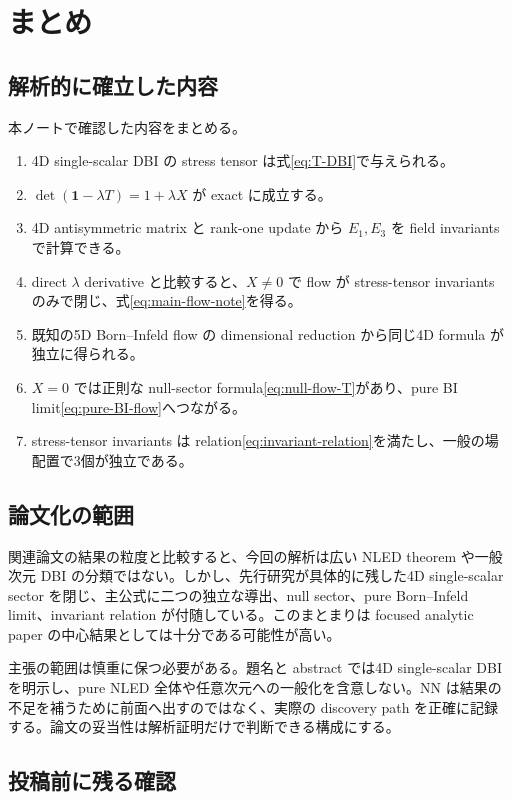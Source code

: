 \documentclass[a4paper,11pt]{ltjsreport}
\newcommand{\Id}{\mathbf 1}
\begin{document}
\chapter{まとめ}

\section{解析的に確立した内容}

本ノートで確認した内容をまとめる。
\begin{enumerate}[label=\arabic*.]
 \item 4D single-scalar DBI の stress tensor は式\eqref{eq:T-DBI}で与えられる。
 \item $\det(\Id-\lambda T)=1+\lambda X$ が exact に成立する。
 \item 4D antisymmetric matrix と rank-one update から $E_1,E_3$ を field invariants で計算できる。
 \item direct $\lambda$ derivative と比較すると、$X\neq0$ で flow が stress-tensor invariants のみで閉じ、式\eqref{eq:main-flow-note}を得る。
 \item 既知の5D Born--Infeld flow の dimensional reduction から同じ4D formula が独立に得られる。
 \item $X=0$ では正則な null-sector formula\eqref{eq:null-flow-T}があり、pure BI limit\eqref{eq:pure-BI-flow}へつながる。
 \item stress-tensor invariants は relation\eqref{eq:invariant-relation}を満たし、一般の場配置で3個が独立である。
\end{enumerate}

\section{論文化の範囲}

関連論文の結果の粒度と比較すると、今回の解析は広い NLED theorem や一般次元 DBI の分類ではない。しかし、先行研究が具体的に残した4D single-scalar sector を閉じ、主公式に二つの独立な導出、null sector、pure Born--Infeld limit、invariant relation が付随している。このまとまりは focused analytic paper の中心結果としては十分である可能性が高い。

主張の範囲は慎重に保つ必要がある。題名と abstract では4D single-scalar DBI を明示し、pure NLED 全体や任意次元への一般化を含意しない。NN は結果の不足を補うために前面へ出すのではなく、実際の discovery path を正確に記録する。論文の妥当性は解析証明だけで判断できる構成にする。

\section{投稿前に残る確認}
\end{document}
